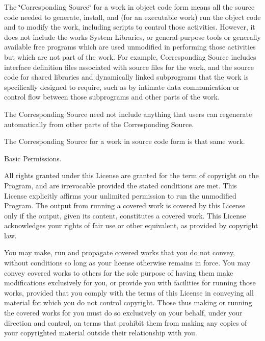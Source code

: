The \char`\"{}\+Corresponding Source\char`\"{} for a work in object code form means all the source code needed to generate, install, and (for an executable work) run the object code and to modify the work, including scripts to control those activities. However, it does not include the work\textquotesingle{}s System Libraries, or general-\/purpose tools or generally available free programs which are used unmodified in performing those activities but which are not part of the work. For example, Corresponding Source includes interface definition files associated with source files for the work, and the source code for shared libraries and dynamically linked subprograms that the work is specifically designed to require, such as by intimate data communication or control flow between those subprograms and other parts of the work.

The Corresponding Source need not include anything that users can regenerate automatically from other parts of the Corresponding Source.

The Corresponding Source for a work in source code form is that same work.


\begin{DoxyEnumerate}
\item Basic Permissions.
\end{DoxyEnumerate}

All rights granted under this License are granted for the term of copyright on the Program, and are irrevocable provided the stated conditions are met. This License explicitly affirms your unlimited permission to run the unmodified Program. The output from running a covered work is covered by this License only if the output, given its content, constitutes a covered work. This License acknowledges your rights of fair use or other equivalent, as provided by copyright law.

You may make, run and propagate covered works that you do not convey, without conditions so long as your license otherwise remains in force. You may convey covered works to others for the sole purpose of having them make modifications exclusively for you, or provide you with facilities for running those works, provided that you comply with the terms of this License in conveying all material for which you do not control copyright. Those thus making or running the covered works for you must do so exclusively on your behalf, under your direction and control, on terms that prohibit them from making any copies of your copyrighted material outside their relationship with you.


